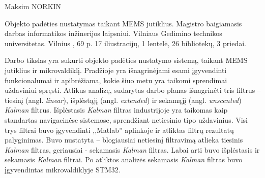 Maksim NORKIN

Objekto padėties nustatymas taikant MEMS jutiklius. 
Magistro baigiamasis darbas informatikos inžinerijos laipsniui. 
Vilniaus Gedimino technikos universitetas.
Vilnius \the\year, 69 p. 17 iliustracijų, 1 lentelė, 26 bibliotekų, 3 priedai.

Darbo tikslas yra sukurti objekto padėties nustatymo sistemą, taikant MEMS jutiklius ir mikrovaldiklį.
Pradžioje yra išnagrinėjami esami įgyvendinti funkcionalumai ir apibrėžiama, kokie šiuo metu yra taikomi sprendimai uždaviniui spręsti.
Atlikus analizę, sudarytas darbo planas išnagrinėti tris filtrus -- tiesinį (angl. \textit{linear}), išplėstąjį (angl. \textit{extended}) ir sekamąjį (angl. \textit{unscented}) \textit{Kalman} filtrus.
Išplėstasis \textit{Kalman} filtras industrijoje yra taikomas kaip standartas navigacinėse sistemose, sprendžiant netiesinio tipo uždavinius.
Visi trys filtrai buvo įgyvendinti ,,Matlab'' aplinkoje ir atliktas filtrų rezultatų palyginimas.
Buvo nustatyta -- blogiausiai netiesinį filtravimą atlieka tiesinis \textit{Kalman} filtras, geriausiai - sekamasis \textit{Kalman} filtras.
Labai arti buvo išplėstasis ir sekamasis \textit{Kalman} filtrai.
Po atliktos analizės sekamasis \textit{Kalman} filtras buvo įgyvendintas mikrovaldiklyje STM32.

